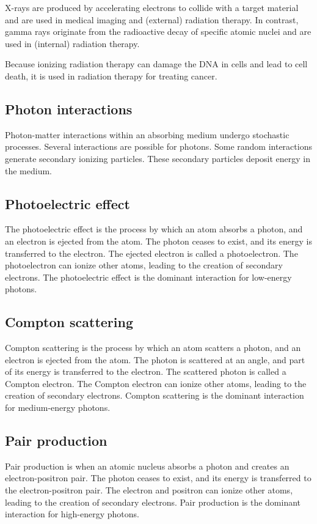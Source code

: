 X-rays are produced by accelerating electrons to collide with a target material and are used in medical imaging and (external) radiation therapy.
In contrast, gamma rays originate from the radioactive decay of specific atomic nuclei and are used in (internal) radiation therapy. 

Because ionizing radiation therapy can damage the DNA in cells and lead to cell death, it is used in radiation therapy for treating cancer.

\subsection{Photon interactions}
Photon-matter interactions within an absorbing medium undergo stochastic processes.
Several interactions are possible for photons.
Some random interactions generate secondary ionizing particles.
These secondary particles deposit energy in the medium.

\subsection{Photoelectric effect}
The photoelectric effect is the process by which an atom absorbs a photon, and an electron is ejected from the atom.
The photon ceases to exist, and its energy is transferred to the electron.
The ejected electron is called a photoelectron.
The photoelectron can ionize other atoms, leading to the creation of secondary electrons.
The photoelectric effect is the dominant interaction for low-energy photons.

\subsection{Compton scattering}
Compton scattering is the process by which an atom scatters a photon, and an electron is ejected from the atom.
The photon is scattered at an angle, and part of its energy is transferred to the electron.
The scattered photon is called a Compton electron.
The Compton electron can ionize other atoms, leading to the creation of secondary electrons.
Compton scattering is the dominant interaction for medium-energy photons.

\subsection{Pair production}
Pair production is when an atomic nucleus absorbs a photon and creates an electron-positron pair.
The photon ceases to exist, and its energy is transferred to the electron-positron pair.
The electron and positron can ionize other atoms, leading to the creation of secondary electrons.
Pair production is the dominant interaction for high-energy photons.

